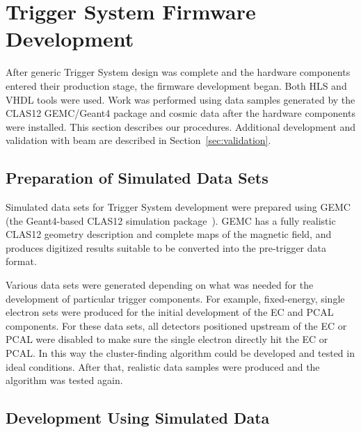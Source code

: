 \section{Trigger System Firmware Development}

After generic Trigger System design was complete and the hardware components entered their production
stage, the firmware development began. Both HLS and VHDL tools were used. Work was performed using data
samples generated by the CLAS12 GEMC/Geant4 package and cosmic data after the hardware components
were installed. This section describes our procedures. Additional development and validation with beam are
described in Section~\ref{sec:validation}.

\subsection{Preparation of Simulated Data Sets}
\label{simulated_data_preparation}

Simulated data sets for Trigger System development were prepared using GEMC (the Geant4-based CLAS12
simulation package~\cite{gemc-ref}). GEMC has a fully realistic CLAS12 geometry description and complete
maps of the magnetic field, and produces digitized results suitable to be converted into the pre-trigger data
format.

Various data sets were generated depending on what was needed for the development of particular trigger
components. For example, fixed-energy, single electron sets were produced for the initial development of the
EC and PCAL components. For these data sets, all detectors positioned upstream of the EC or PCAL were
disabled to make sure the single electron directly hit the EC or PCAL. In this way the cluster-finding algorithm
could be developed and tested in ideal conditions. After that, realistic data samples were produced and the
algorithm was tested again.



\subsection{Development Using Simulated Data}

